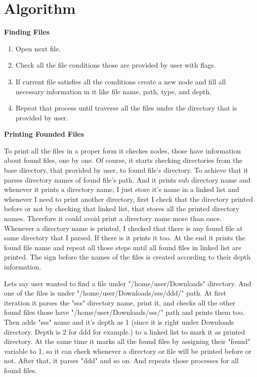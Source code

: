 \documentclass{article}
\begin{document}
\section{Algorithm}
\hspace{\parindent} \textbf{Finding Files}

\begin{enumerate}[leftmargin=1.7\parindent]
  \item Open next file.
  \item Check all the file conditions those are provided by user with flags. 
  \item If current file satisfies all the conditions create a new node and fill all necessary information in it like file name, path, type, and depth.
  \item Repeat that process until traverse all the files under the directory that is provided by user.
\end{enumerate}

\setlength{\parindent}{5ex}
\hspace{\parindent}\textbf{Printing Founded Files}

\hspace{\parindent} To print all the files in a proper form it checkes nodes, those have information about found files, one by one. Of course, it starts checking directories from the base directory, that provided by user, to found file's directory. To achieve that it parses directory names of found file's path. And it prints sub directory name and whenever it prints a directory name, I just store it's name in a linked list and whenever I need to print another directory, first I check that the directory printed before or not by checking that linked list, that stores all the printed directory names. Therefore it could avoid print a directory name more than once. Whenever a directory name is printed, I checked that there is any found file at same directory that I parsed. If there is it prints it too. At the end it prints the found file name and repeat all those steps until all found files in linked list are printed. The sign before the names of the files is created according to their depth information. \par
\hspace{\parindent} Lets say user wanted to find a file under "/home/user/Downloads" directory. And one of the files is under              "/home/user/Downloads/sss/ddd/" path. At first iteration it parses the "sss" directory name, print it, and checks all the other found files those have "/home/user/Downloads/sss/" path and prints them too. Then adds "sss" name and it's depth as 1 (since it is right under Downloads directory. Depth is 2 for ddd for example.) to a linked list to mark it as printed directory. At the same time it marks all the found files by assigning their "found" variable to 1, so it can check whenever a directory or file will be printed before or not. After that, it parses "ddd" and so on. And repeats those processes for all found files. \par
\end{document}
